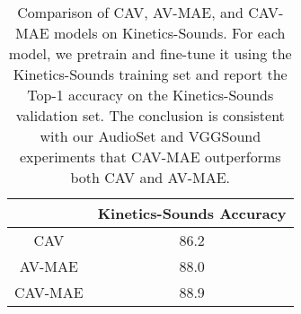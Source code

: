 \documentclass{article} \usepackage{iclr2023_conference,times}
\begin{document}
\begin{table}[h]
\centering
\caption{Comparison of CAV, AV-MAE, and CAV-MAE models on Kinetics-Sounds. For each model, we pretrain and fine-tune it using the Kinetics-Sounds training set and report the Top-1 accuracy on the Kinetics-Sounds validation set. The conclusion is consistent with our AudioSet and VGGSound experiments that CAV-MAE outperforms both CAV and AV-MAE.}
\label{tab:ks}
\begin{tabular}{@{}cc@{}}
\toprule
        & Kinetics-Sounds Accuracy \\ \midrule
CAV     & 86.2                     \\
AV-MAE  & 88.0                     \\
CAV-MAE & 88.9                     \\ \bottomrule
\end{tabular}
\end{table}
\end{document}
